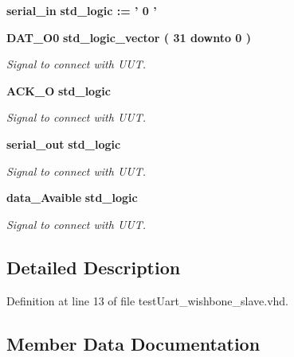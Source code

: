 \begin{DoxyCompactItemize}
\item 
{\bf serial\-\_\-in} {\bfseries std\-\_\-logic  \-:= '  0  ' } \label{classtest_uart__wishbone__slave_1_1behavior_a15d41e2405387248c782af0ee1e11517}

\item 
{\bf D\-A\-T\-\_\-\-O0} {\bfseries std\-\_\-logic\-\_\-vector (   31    downto    0  ) } \label{classtest_uart__wishbone__slave_1_1behavior_aa444d95093cb5f8197bb92d21da1f43a}

\begin{DoxyCompactList}\small\item\em Signal to connect with U\-U\-T. \end{DoxyCompactList}\item 
{\bf A\-C\-K\-\_\-\-O} {\bfseries std\-\_\-logic } \label{classtest_uart__wishbone__slave_1_1behavior_a21f50c72e4e45c54ea44e014934312d4}

\begin{DoxyCompactList}\small\item\em Signal to connect with U\-U\-T. \end{DoxyCompactList}\item 
{\bf serial\-\_\-out} {\bfseries std\-\_\-logic } \label{classtest_uart__wishbone__slave_1_1behavior_a30dda061cfa67e7c4d84ec0f5d1cb295}

\begin{DoxyCompactList}\small\item\em Signal to connect with U\-U\-T. \end{DoxyCompactList}\item 
{\bf data\-\_\-\-Avaible} {\bfseries std\-\_\-logic } \label{classtest_uart__wishbone__slave_1_1behavior_a051f773441045ed070bde8d6139dd817}

\begin{DoxyCompactList}\small\item\em Signal to connect with U\-U\-T. \end{DoxyCompactList}\end{DoxyCompactItemize}


\subsection{Detailed Description}


Definition at line 13 of file test\-Uart\-\_\-wishbone\-\_\-slave.\-vhd.



\subsection{Member Data Documentation}
